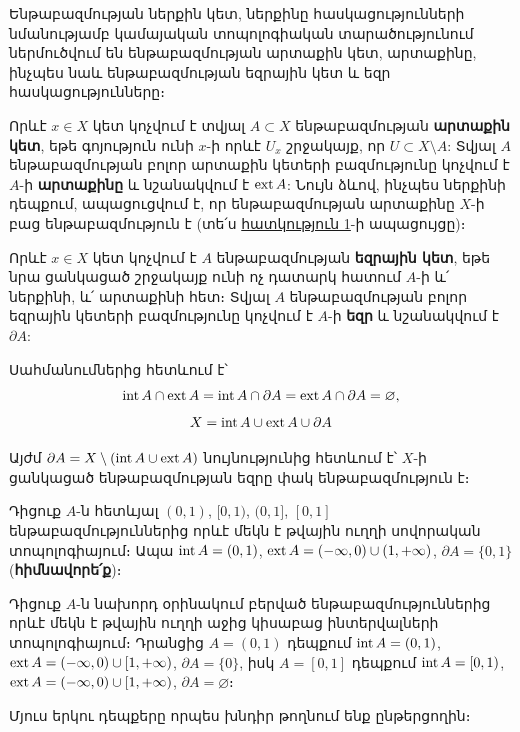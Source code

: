 \documentclass[./main.tex]{subfiles}
\begin{document}
\par Ենթաբազմության ներքին կետ, ներքինը հասկացությունների նմանությամբ \linebreak կամայական տոպոլոգիական տարածությունում ներմուծվում են ենթաբազմության արտաքին կետ, արտաքինը, ինչպես նաև ենթաբազմության եզրային կետ և եզր հասկացությունները։ 

\par Որևէ $x \in X$ կետ կոչվում է տվյալ $A \subset X$ ենթաբազմության \textbf{արտաքին կետ}, եթե գոյություն ունի $x$-ի որևէ $U_x$ շրջակայք, որ $U \subset X\setminus A$: Տվյալ $A$ ենթաբազմության բոլոր արտաքին կետերի բազմությունը կոչվում է $A$-ի \textbf{արտաքինը} և նշանակվում է $\operatorname{ext} A$: Նույն ձևով, ինչպես ներքինի դեպքում, ապացուցվում է, որ ենթաբազմության արտաքինը $X$-ի բաց ենթաբազմություն է (տե՛ս \hyperref[հատկություն 1]{հատկություն 1}-ի ապացույցը)։

\par Որևէ $x\in X$ կետ կոչվում է $A$ ենթաբազմության \textbf{եզրային կետ}, եթե նրա ցան\-կացած շրջակայք ունի ոչ դատարկ հատում $A$-ի և՛ ներքինի, և՛ արտաքինի հետ։ Տվյալ $A$ ենթաբազմության բոլոր եզրային կետերի բազմությունը կոչվում է $A$-ի \textbf{եզր} և նշանակվում է $\partial A$:

\par Սահմանումներից հետևում է՝
\[
\operatorname{int} A \cap \operatorname{ext} A = \operatorname{int} A \cap \partial A = \operatorname{ext} A \cap \partial A = \varnothing,
\]
\[
X = \operatorname{int} A \cup \operatorname{ext} A \cup \partial A
\]

\par Այժմ $\partial A = X \setminus ({\operatorname{int} A}  \cup {\operatorname{ext}A})$ նույնությունից հետևում է՝ $X$-ի ցանկացած ենթա\-բազմության եզրը փակ ենթաբազմություն է։

\begin{example}\label{ch6ex2} \label{Օրինակ 1։}
Դիցուք $A$-ն հետևյալ $(0,1)$, $[0,1)$, $(0,1]$, $[0,1]$ ենթաբազմություն\-նե\-րից որևէ մեկն է թվային ուղղի սովորական տոպոլոգիայում։ Ապա $ \operatorname{int} A = (0, 1)$, $\operatorname{ext} A = (-\infty, 0) \cup (1, +\infty)$, $ \partial A = \{0, 1\}$ (\textbf{հիմնավորե՛ք})։
\end{example}

\begin{example}\label{ch6ex3} \label{Օրինակ 2։}
Դիցուք $A$-ն նախորդ օրինակում բերված ենթաբազմություններից որևէ մեկն է թվային ուղղի աջից կիսաբաց ինտերվալների տոպոլոգիայում։ Դրան\-ցից $A = (0,1)$ դեպքում $\operatorname{int} A = (0,1)$, $\operatorname{ext} A = (-\infty,0) \cup [1,+\infty)$, $ \partial A = \{0\}$, իսկ $A=[0,1]$ դեպքում  $\operatorname{int} A = [0,1)$, $\operatorname{ext} A = (-\infty,0) \cup [1,+\infty)$, $\partial A = \varnothing $։

Մյուս երկու դեպքերը որպես խնդիր թողնում ենք ընթերցողին։
\end{example}
\end{document}
